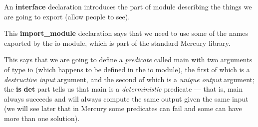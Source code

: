 \documentclass[a4paper,11pt,notitlepage,onecolumn]{book}
\begin{document}
An \textsf{\textbf{interface}} declaration introduces the part of module describing the
things we are going to export (\ie allow people to see).
\begin{small}

\begin{ptabular}
\nextline
\end{ptabular}

\end{small}
This \textsf{\textbf{import\_module}} declaration says that we need to use some of the names
exported by the \textsf{io} module, which is part of the standard Mercury library.
\begin{small}

\begin{ptabular}
\nextline
\end{ptabular}

\end{small}
This says that we are going to define a \emph{predicate} called \textsf{main} with
two arguments of type \textsf{io} (which happens to be defined in the \textsf{io}
module), the first of which is a \emph{destructive input} argument, and the
second of which is a \emph{unique output} argument; the \textsf{\textbf{is} \textbf{det}} part
tells us that \textsf{main} is a \emph{deterministic} predicate --- that is,
\textsf{main} always succeeds and will always compute the same output given the
same input (we will see later that in Mercury some predicates can fail and
some can have more than one solution).
\end{document}
